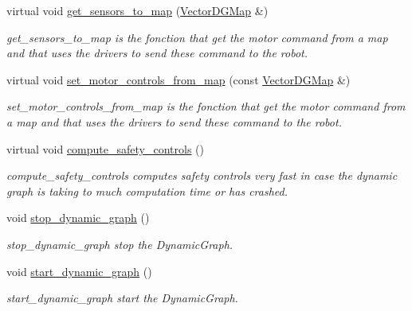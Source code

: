 \begin{DoxyCompactItemize}
virtual void \hyperlink{classdynamic__graph_1_1DynamicGraphManager_a7bddce83d5185433041ad27610b85b3a}{get\+\_\+sensors\+\_\+to\+\_\+map} (\hyperlink{namespacedynamic__graph_a51212ed7fa4ae81e7b362a27f09b7ab8}{Vector\+D\+G\+Map} \&)
\begin{DoxyCompactList}\small\item\em get\+\_\+sensors\+\_\+to\+\_\+map is the fonction that get the motor command from a map and that uses the drivers to send these command to the robot. \end{DoxyCompactList}\item 
virtual void \hyperlink{classdynamic__graph_1_1DynamicGraphManager_a506e6f37ac7205efaf0efe4202cde897}{set\+\_\+motor\+\_\+controls\+\_\+from\+\_\+map} (const \hyperlink{namespacedynamic__graph_a51212ed7fa4ae81e7b362a27f09b7ab8}{Vector\+D\+G\+Map} \&)
\begin{DoxyCompactList}\small\item\em set\+\_\+motor\+\_\+controls\+\_\+from\+\_\+map is the fonction that get the motor command from a map and that uses the drivers to send these command to the robot. \end{DoxyCompactList}\item 
\mbox{\label{classdynamic__graph_1_1DynamicGraphManager_a60bb31040121d6041b4dd6556f5c7eac}} 
virtual void \hyperlink{classdynamic__graph_1_1DynamicGraphManager_a60bb31040121d6041b4dd6556f5c7eac}{compute\+\_\+safety\+\_\+controls} ()
\begin{DoxyCompactList}\small\item\em compute\+\_\+safety\+\_\+controls computes safety controls very fast in case the dynamic graph is taking to much computation time or has crashed. \end{DoxyCompactList}\item 
void \hyperlink{classdynamic__graph_1_1DynamicGraphManager_ad3c7c528ef283fbfb803377c8c631b4c}{stop\+\_\+dynamic\+\_\+graph} ()
\begin{DoxyCompactList}\small\item\em stop\+\_\+dynamic\+\_\+graph stop the Dynamic\+Graph. \end{DoxyCompactList}\item 
void \hyperlink{classdynamic__graph_1_1DynamicGraphManager_a1bfd2b965dde19d12d63f5928a4f670c}{start\+\_\+dynamic\+\_\+graph} ()
\begin{DoxyCompactList}\small\item\em start\+\_\+dynamic\+\_\+graph start the Dynamic\+Graph. \end{DoxyCompactList}\item 

\end{DoxyCompactItemize}
